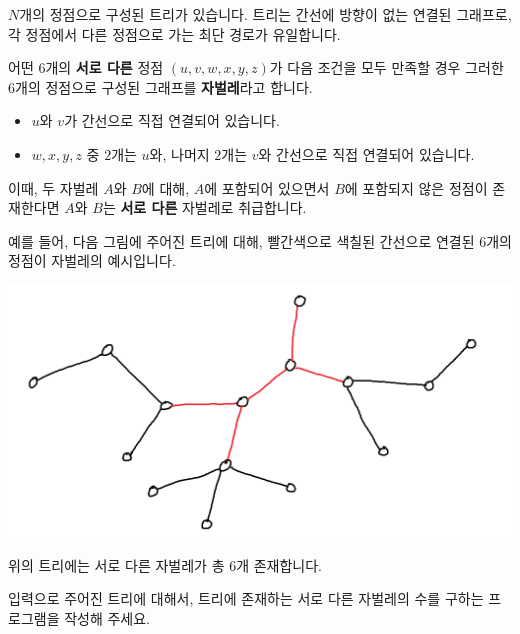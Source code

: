 $N$개의 정점으로 구성된 트리가 있습니다. 트리는 간선에 방향이 없는 연결된 그래프로, 각 정점에서 다른 정점으로 가는 최단 경로가 유일합니다.

어떤 $6$개의 \textbf{서로 다른} 정점 $(u,v,w,x,y,z)$가 다음 조건을 모두 만족할 경우 그러한 $6$개의 정점으로 구성된 그래프를 \textbf{자벌레}라고 합니다.

\begin{itemize}
\item $u$와 $v$가 간선으로 직접 연결되어 있습니다.
\item $w,x,y,z$ 중 $2$개는 $u$와, 나머지 $2$개는 $v$와 간선으로 직접 연결되어 있습니다.
\end{itemize}

이때, 두 자벌레 $A$와 $B$에 대해, $A$에 포함되어 있으면서 $B$에 포함되지 않은 정점이 존재한다면 $A$와 $B$는 \textbf{서로 다른} 자벌레로 취급합니다.

예를 들어, 다음 그림에 주어진 트리에 대해, 빨간색으로 색칠된 간선으로 연결된 $6$개의 정점이 자벌레의 예시입니다.

\begin{center}
  \includegraphics[scale=0.5]{stickbug.png}
\end{center}

위의 트리에는 서로 다른 자벌레가 총 $6$개 존재합니다.

입력으로 주어진 트리에 대해서, 트리에 존재하는 서로 다른 자벌레의 수를 구하는 프로그램을 작성해 주세요.